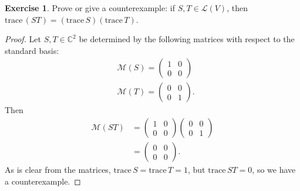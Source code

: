 \documentclass{article}
\theoremstyle{definition}
\newtheorem{ex}{Exercise}
\begin{document}
\begin{ex}
	Prove or give a counterexample: if $S, T \in \mathcal{L}(V)$, then $\mathrm{trace}\,(ST) = (\mathrm{trace}\,S)(\mathrm{trace}\,T)$.
\end{ex}
\begin{proof}
	Let $S, T \in \mathbb{C}^2$ be determined by the following matrices with respect to the standard basis: \begin{align*}
		 & \mathcal{M}(S) = \begin{pmatrix}
			                    1 & 0 \\
			                    0 & 0
		                    \end{pmatrix} \\
		 & \mathcal{M}(T) = \begin{pmatrix}
			                    0 & 0 \\
			                    0 & 1
		                    \end{pmatrix}.
	\end{align*}
	Then \begin{align*}
		\mathcal{M}(ST) & = \begin{pmatrix}
			                    1 & 0 \\
			                    0 & 0
		                    \end{pmatrix}
		\begin{pmatrix}
			0 & 0 \\
			0 & 1
		\end{pmatrix}                     \\
		                & = \begin{pmatrix}
			                    0 & 0 \\
			                    0 & 0
		                    \end{pmatrix}.
	\end{align*}
	As is clear from the matrices, $\mathrm{trace}\,S = \mathrm{trace}\,T = 1$, but $\mathrm{trace}\,ST = 0$, so we have a counterexample.
\end{proof}
\end{document}
